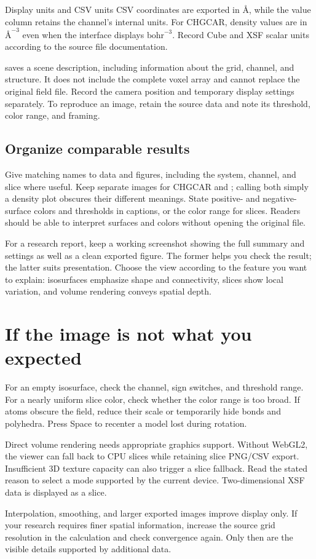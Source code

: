 \begin{notebox}{Display units and CSV units}
CSV coordinates are exported in \AA, while the value column retains the channel's internal units. For \mbox{CHGCAR}, density values are in $\text{\AA}^{-3}$ even when the interface displays $\mathrm{bohr}^{-3}$. Record Cube and XSF scalar units according to the source file documentation.
\end{notebox}

 saves a scene description, including information about the grid, channel, and structure. It does not include the complete voxel array and cannot replace the original field file. Record the camera position and temporary display settings separately. To reproduce an image, retain the source data and note its threshold, color range, and framing.

\subsection{Organize comparable results}

Give matching names to data and figures, including the system, channel, and slice where useful. Keep separate images for CHGCAR  and ; calling both simply a density plot obscures their different meanings. State positive- and negative-surface colors and thresholds in captions, or the color range for slices. Readers should be able to interpret surfaces and colors without opening the original file.

For a research report, keep a working screenshot showing the full summary and settings as well as a clean exported figure. The former helps you check the result; the latter suits presentation. Choose the view according to the feature you want to explain: isosurfaces emphasize shape and connectivity, slices show local variation, and volume rendering conveys spatial depth.

\section{If the image is not what you expected}

For an empty isosurface, check the channel, sign switches, and threshold range. For a nearly uniform slice color, check whether the color range is too broad. If atoms obscure the field, reduce their scale or temporarily hide bonds and polyhedra. Press Space to recenter a model lost during rotation.

Direct volume rendering needs appropriate graphics support. Without WebGL2, the viewer can fall back to CPU slices while retaining slice PNG/CSV export. Insufficient 3D texture capacity can also trigger a slice fallback. Read the stated reason to select a mode supported by the current device. Two-dimensional XSF data is displayed as a slice.

Interpolation, smoothing, and larger exported images improve display only. If your research requires finer spatial information, increase the source grid resolution in the calculation and check convergence again. Only then are the visible details supported by additional data.
